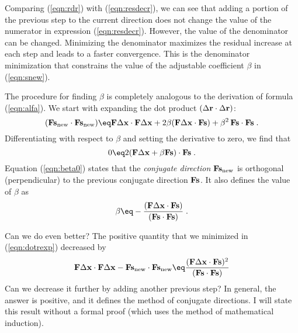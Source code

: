 Comparing (\ref{eqn:rdr}) with (\ref{eqn:resdecr}), we can see that
adding a portion of the previous step to the current direction does
not change the value of the numerator in expression
(\ref{eqn:resdecr}). However, the value of the denominator can be
changed. Minimizing the denominator maximizes the residual increase at
each step and leads to a faster convergence. This is the denominator
minimization that constrains the value of the adjustable coefficient
$\beta$ in (\ref{eqn:snew}).
\par
The procedure for finding $\beta$ is completely analogous to the
derivation of formula (\ref{eqn:alfa}). We start with expanding the
dot product $(\Delta \bold r \cdot \Delta \bold r)$:
\begin{equation}
  \label{eqn:dotrexp}
  (\bold F \bold s_{\rm new} \cdot \bold F \bold s_{\rm new}) \eq
  \bold F \Delta \bold x \cdot \bold F \Delta \bold x +
  2 \beta (\bold F \Delta \bold x \cdot \bold F \bold s) +
  \beta^2\,\bold F \bold s \cdot \bold F \bold s\;.
\end{equation}
Differentiating with respect to $\beta$ and setting the derivative to
zero,
we find that
\begin{equation}
  \label{eqn:beta0}
  0 \eq 2 (\bold F \Delta \bold x + \beta \bold F \bold s) 
  \cdot \bold F \bold s\;.
\end{equation}
Equation (\ref{eqn:beta0}) states that the \emph{conjugate direction}
$\bold F \bold s_{\rm new}$ is orthogonal (perpendicular) to the
previous conjugate direction $\bold F \bold s$. It also defines the
value of $\beta$ as
\begin{equation}
  \label{eqn:beta}
  \beta \eq - \frac{ (\bold F \Delta \bold x \cdot \bold F \bold s )}
  {(\bold F \bold s \cdot \bold F \bold s )}\;.
\end{equation}
\par
Can we do even better? The positive quantity that we minimized in
(\ref{eqn:dotrexp}) decreased by
\begin{equation}
  \label{eqn:sdecr}
  \bold F \Delta \bold x \cdot \bold F \Delta \bold x -
  \bold F \bold s_{\rm new} \cdot \bold F \bold s_{\rm new} \eq
  \frac{ (\bold F \Delta \bold x \cdot \bold F \bold s )^2}
  {(\bold F \bold s \cdot \bold F \bold s )}
\end{equation}
Can we decrease it further by adding another previous step? In
general, the answer is positive, and it defines the method of
conjugate directions. I will state this result without a formal proof
(which uses the method of mathematical induction). 
